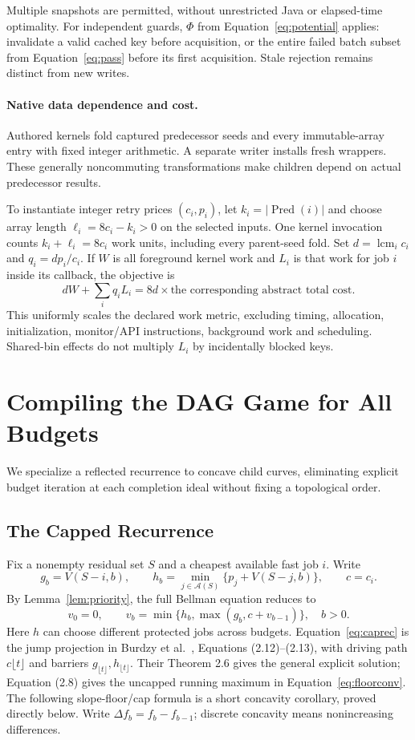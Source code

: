 \documentclass[acmsmall,screen,review,anonymous]{acmart}
\begin{document}
Multiple snapshots are permitted, without unrestricted Java or elapsed-time optimality. For independent guards, $\Phi$ from Equation~\eqref{eq:potential} applies: invalidate a valid cached key before acquisition, or the entire failed batch subset from Equation~\eqref{eq:pass} before its first acquisition. Stale rejection remains distinct from new writes.


\paragraph{Native data dependence and cost.}
Authored kernels fold captured predecessor seeds and every immutable-array entry with fixed integer arithmetic. A separate writer installs fresh wrappers. These generally noncommuting transformations make children depend on actual predecessor results.

To instantiate integer retry prices $(c_i,p_i)$, let $k_i=|\operatorname{Pred}(i)|$ and choose array length $\ell_i=8c_i-k_i>0$ on the selected inputs. One kernel invocation counts $k_i+\ell_i=8c_i$ work units, including every parent-seed fold. Set $d=\operatorname{lcm}_i c_i$ and $q_i=dp_i/c_i$. If $W$ is all foreground kernel work and $L_i$ is that work for job $i$ inside its callback, the objective is
\[
 dW+\sum_i q_iL_i=8d\times\text{the corresponding abstract total cost}.
\]
This uniformly scales the declared work metric, excluding timing, allocation, initialization, monitor/API instructions, background work and scheduling. Shared-bin effects do not multiply $L_i$ by incidentally blocked keys.

\section{Compiling the DAG Game for All Budgets}
\label{sec:curves}

We specialize a reflected recurrence to concave child curves, eliminating explicit budget iteration at each completion ideal without fixing a topological order.

\subsection{The Capped Recurrence}

Fix a nonempty residual set $S$ and a cheapest available fast job $i$. Write
\[
 g_b=V(S-i,b),\qquad
 h_b=\min_{j\in\mathcal A(S)}\{p_j+V(S-j,b)\},\qquad c=c_i.
\]
By Lemma~\ref{lem:priority}, the full Bellman equation reduces to
\begin{equation}
 v_0=0,\qquad v_b=\min\{h_b,\max(g_b,c+v_{b-1})\},\quad b>0.
 \label{eq:caprec}
\end{equation}
Here $h$ can choose different protected jobs across budgets. Equation~\eqref{eq:caprec} is the jump projection in Burdzy et al.~\cite{bkr}, Equations (2.12)--(2.13), with driving path $c\lfloor t\rfloor$ and barriers $g_{\lfloor t\rfloor},h_{\lfloor t\rfloor}$. Their Theorem 2.6 gives the general explicit solution; Equation (2.8) gives the uncapped running maximum in Equation~\eqref{eq:floorconv}. The following slope-floor/cap formula is a short concavity corollary, proved directly below. Write $\Delta f_b=f_b-f_{b-1}$; discrete concavity means nonincreasing differences.
\end{document}
